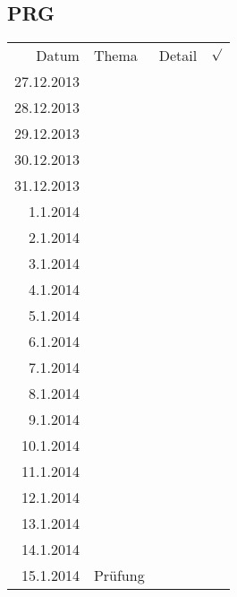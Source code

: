 \subsection{PRG}
\begin{tabular}{r l p{} l}
\rowcolor{lgray} Datum       & Thema         & Detail & $\surd$ \\
\rowcolor{white}  27.12.2013 &               &  &  \\
\rowcolor{lgray}  28.12.2013 &               &  &  \\
\rowcolor{white}  29.12.2013 &               &  &  \\
\rowcolor{lgray}  30.12.2013 &               &  &  \\
\rowcolor{white}  31.12.2013 &               &  &  \\
\rowcolor{lgray}    1.1.2014 &               &  &  \\
\rowcolor{white}    2.1.2014 &               &  &  \\
\rowcolor{lgray}    3.1.2014 &               &  &  \\
\rowcolor{white}    4.1.2014 &               &  &  \\
\rowcolor{lgray}    5.1.2014 &               &  &  \\
\rowcolor{white}    6.1.2014 &               &  &  \\
\rowcolor{lgray}    7.1.2014 &               &  &  \\
\rowcolor{white}    8.1.2014 &               &  &  \\
\rowcolor{lgray}    9.1.2014 &               &  &  \\
\rowcolor{white}   10.1.2014 &               &  &  \\
\rowcolor{lgray}   11.1.2014 &               &  &  \\
\rowcolor{white}   12.1.2014 &               &  &  \\
\rowcolor{lgray}   13.1.2014 &               &  &  \\
\rowcolor{white}   14.1.2014 &               &  &  \\
\rowcolor{lgray}   15.1.2014 & Prüfung       &  &  \\
\end{tabular}

